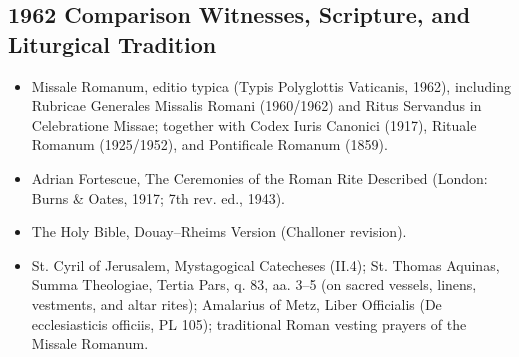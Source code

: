 \subsection*{1962 Comparison Witnesses, Scripture, and Liturgical Tradition}
\begin{itemize}
\item Missale Romanum, editio typica (Typis Polyglottis Vaticanis, 1962), including Rubricae Generales Missalis Romani (1960/1962) and Ritus Servandus in Celebratione Missae; together with Codex Iuris Canonici (1917), Rituale Romanum (1925/1952), and Pontificale Romanum (1859).
\item Adrian Fortescue, The Ceremonies of the Roman Rite Described (London: Burns \& Oates, 1917; 7th rev. ed., 1943).
\item The Holy Bible, Douay--Rheims Version (Challoner revision).
\item St. Cyril of Jerusalem, Mystagogical Catecheses (II.4); St. Thomas Aquinas, Summa Theologiae, Tertia Pars, q. 83, aa. 3--5 (on sacred vessels, linens, vestments, and altar rites); Amalarius of Metz, Liber Officialis (De ecclesiasticis officiis, PL 105); traditional Roman vesting prayers of the Missale Romanum.
\end{itemize}
